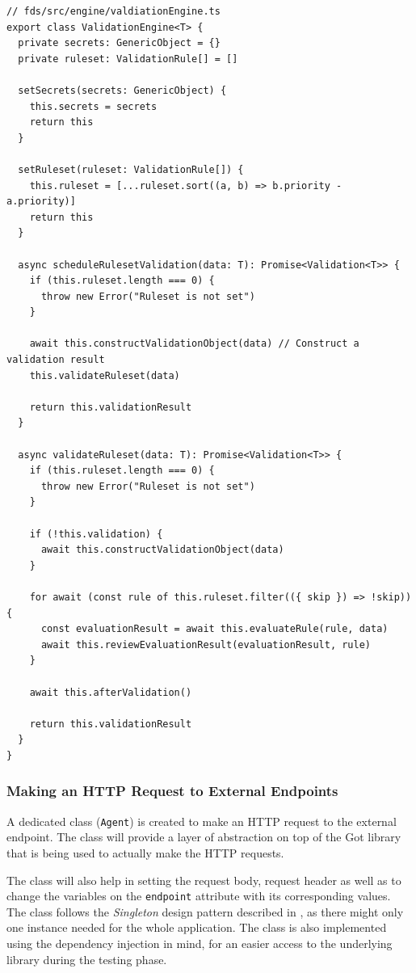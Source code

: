       \begin{lstlisting}[style=es6, caption={ValidationEngine class and the scheduleRulesetValidation method (TypeScript)}]
// fds/src/engine/valdiationEngine.ts
export class ValidationEngine<T> {
  private secrets: GenericObject = {}
  private ruleset: ValidationRule[] = []

  setSecrets(secrets: GenericObject) {
    this.secrets = secrets
    return this
  }

  setRuleset(ruleset: ValidationRule[]) {
    this.ruleset = [...ruleset.sort((a, b) => b.priority - a.priority)]
    return this
  }

  async scheduleRulesetValidation(data: T): Promise<Validation<T>> {
    if (this.ruleset.length === 0) {
      throw new Error("Ruleset is not set")
    }

    await this.constructValidationObject(data) // Construct a validation result
    this.validateRuleset(data)

    return this.validationResult
  }

  async validateRuleset(data: T): Promise<Validation<T>> {
    if (this.ruleset.length === 0) {
      throw new Error("Ruleset is not set")
    }

    if (!this.validation) {
      await this.constructValidationObject(data)
    }

    for await (const rule of this.ruleset.filter(({ skip }) => !skip)) {
      const evaluationResult = await this.evaluateRule(rule, data)
      await this.reviewEvaluationResult(evaluationResult, rule)
    }

    await this.afterValidation()

    return this.validationResult
  }
}
      \end{lstlisting}

    \subsubsection{Making an HTTP Request to External Endpoints}

      A dedicated class (\verb;Agent;) is created to make an HTTP request to the external endpoint. The class will provide a layer of abstraction on top of the Got library that is being used to actually make the HTTP requests. 
      
      The class will also help in setting the request body, request header as well as to change the variables on the \verb;endpoint; attribute with its corresponding values. The class follows the \emph{Singleton} design pattern described in \autocite[pp. 127-134]{gamma-1995}, as there might only one instance needed for the whole application. The class is also implemented using the dependency injection in mind, for an easier access to the underlying library during the testing phase. 

